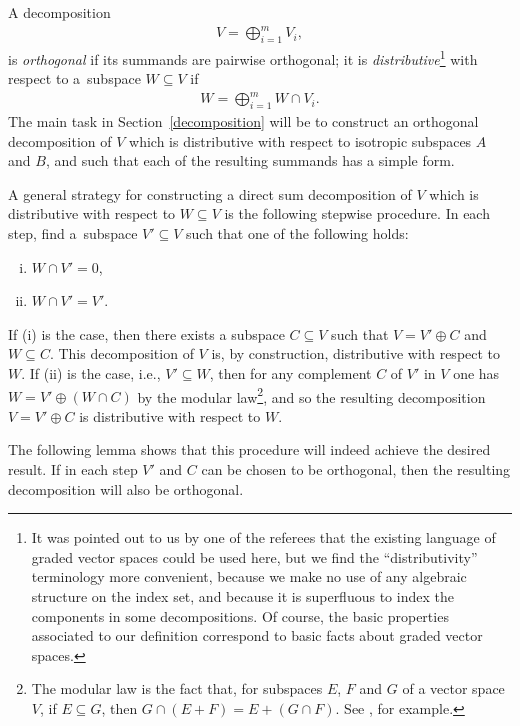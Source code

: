 \documentclass[10pt,a4paper]{amsart}
\numberwithin{equation}{section}
\begin{document}
A decomposition
\begin{gather}\label{direct sum}
V = \bigoplus_{i=1}^m V_i,
\end{gather}
is \textit{orthogonal} if its summands are pairwise orthogonal; it is \textit{distributive}\footnote{It was pointed out to us by one of the referees that the existing language of graded vector spaces could be used here, but we f\/ind the ``distributivity'' terminology more convenient, because we make no use of any algebraic structure on the index set, and because it is superf\/luous to index the components in some decompositions. Of course, the basic properties associated to our def\/inition correspond to basic facts about graded vector spaces.}
 with respect to a~subspace $W \subseteq V$ if
\begin{gather*}%
W = \bigoplus_{i=1}^m W \cap V_i.
\end{gather*}
The main task in Section~\ref{decomposition} will be to construct an orthogonal decomposition of $V$ which is distributive with respect to isotropic subspaces $A$ and $B$, and such that  each of the resulting summands has a simple form.

\begin{Remark}\label{modular iteration} A general strategy for constructing a direct sum decomposition of $V$ which is distributive with respect to $W \subseteq V$ is the following stepwise procedure.
In each step, f\/ind a~subspace $V' \subseteq V$ such that one of the following holds:
\begin{enumerate}[(i)]\itemsep=0pt
\item $W \cap V' = 0$,
\item $W \cap V' = V'$.
\end{enumerate}
If (i) is the case, then there exists a subspace $C \subseteq V$ such that $V = V' \oplus C$ and $W \subseteq C$. This decomposition of $V$ is, by construction, distributive with respect to $W$. If (ii) is the case, i.e., $V' \subseteq W$, then for any complement $C$ of $V'$ in $V$ one has $W = V' \oplus (W \cap C)$ by the modular law\footnote{The modular law is the fact that, for subspaces $E$, $F$ and $G$ of a vector space $V$, if $E \subseteq G$, then  $G \cap (E + F) = E + (G \cap F)$. See \cite[p.~56]{Roman}, for example.}, and so the resulting decomposition $V = V' \oplus C$ is distributive with respect to $W$.
\end{Remark}

The following lemma shows that this procedure will indeed achieve the desired result. If in each step $V'$ and $C$ can be chosen to be orthogonal, then the resulting decomposition will also be orthogonal.
\end{document}

